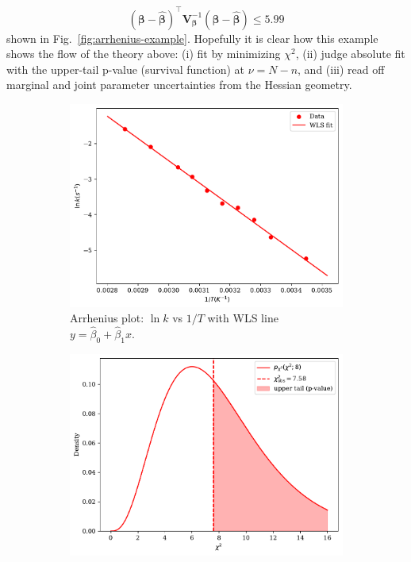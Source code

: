 \begin{exampleBox}
    \begin{equation}
        (\boldsymbol\beta-\hat{\boldsymbol\beta})^\top \mathbf{V}_{\boldsymbol\beta}^{-1}(\boldsymbol\beta-\hat{\boldsymbol\beta}) \le 5.99
    \end{equation}
    shown in Fig.~\ref{fig:arrhenius-example}. Hopefully it is clear how this example shows the flow of the theory above: (i) fit by minimizing $\chi^2$, (ii) judge absolute fit with the upper-tail p-value (survival function) at $\nu=N-n$, and (iii) read off marginal and joint parameter uncertainties from the Hessian geometry.

    \begin{figure}[H]
        \centering
        \begin{subfigure}[t]{0.32\textwidth}
          \centering
          \includegraphics[width=\linewidth]{figs/models-vs-data/arrhenius_plot.pdf}
          \caption{Arrhenius plot: \(\ln k\) vs \(1/T\) with WLS line \(y=\hat\beta_0+\hat\beta_1 x\).}
          \label{subfig:arrhenius-plot}
        \end{subfigure}
        \hfill
        \begin{subfigure}[t]{0.32\textwidth}
          \centering
          \includegraphics[width=\linewidth]{figs/models-vs-data/chi2_tail.pdf}

\end{subfigure}
\end{figure}
\end{exampleBox}
